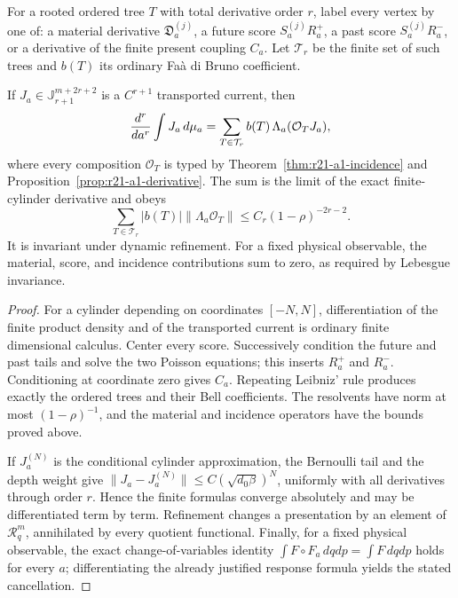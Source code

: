 For a rooted ordered tree $T$ with total derivative order $r$, label every
vertex by one of: a material derivative $\mathfrak D_a^{(j)}$, a future score
$S_a^{(j)}R_a^+$, a past score $S_a^{(j)}R_a^-$, or a derivative of the finite
present coupling $C_a$.  Let $\mathcal T_r$ be the finite set of such trees and
$b(T)$ its ordinary Fa\`a di Bruno coefficient.

\begin{theorem}
\label{thm:r21-a1-response}
If $J_a\in\mathbb J_{r+1}^{m+2r+2}$ is a $C^{r+1}$ transported current, then
\[
 {d^r\over da^r}\int J_a\,d\mu_a
 =\sum_{T\in\mathcal T_r}b(T)\,\Lambda_a(\mathcal O_TJ_a),
\]
where every composition $\mathcal O_T$ is typed by
Theorem~\ref{thm:r21-a1-incidence} and
Proposition~\ref{prop:r21-a1-derivative}.  The sum is the limit of the exact
finite-cylinder derivative and obeys
\[
 \sum_{T\in\mathcal T_r}|b(T)|
 \|\Lambda_a\mathcal O_T\|
 \le C_r(1-\rho)^{-2r-2}.
\]
It is invariant under dynamic refinement.  For a fixed physical observable,
the material, score, and incidence contributions sum to zero, as required by
Lebesgue invariance.
\end{theorem}

\begin{proof}
For a cylinder depending on coordinates $[-N,N]$, differentiation of the
finite product density and of the transported current is ordinary finite
dimensional calculus.  Center every score.  Successively condition the
future and past tails and solve the two Poisson equations; this inserts
$R_a^+$ and $R_a^-$.  Conditioning at coordinate zero gives $C_a$.  Repeating
Leibniz' rule produces exactly the ordered trees and their Bell coefficients.
The resolvents have norm at most $(1-\rho)^{-1}$, and the material and
incidence operators have the bounds proved above.

If $J_a^{(N)}$ is the conditional cylinder approximation, the Bernoulli tail
and the depth weight give
$\|J_a-J_a^{(N)}\|\le C(\sqrt{d_0\beta})^N$, uniformly with all derivatives
through order $r$.  Hence the finite formulas converge absolutely and may be
differentiated term by term.  Refinement changes a presentation by an element
of $\mathcal R_q^m$, annihilated by every quotient functional.  Finally, for
a fixed physical observable, the exact change-of-variables identity
$\int F\circ F_a\,dqdp=\int F\,dqdp$ holds for every $a$; differentiating the
already justified response formula yields the stated cancellation.
\end{proof}

